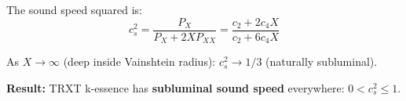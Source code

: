 The sound speed squared is:
\begin{equation}
    c_s^2 = \frac{P_X}{P_X + 2X P_{XX}} = \frac{c_2 + 2c_4 X}{c_2 + 6c_4 X}
\end{equation}

As $X \to \infty$ (deep inside Vainshtein radius): $c_s^2 \to 1/3$ (naturally subluminal).

\begin{mdframed}[backgroundcolor=green!10]
\textbf{Result:} TRXT k-essence has \textbf{subluminal sound speed} everywhere: $0 < c_s^2 \leq 1$.
\end{mdframed}
